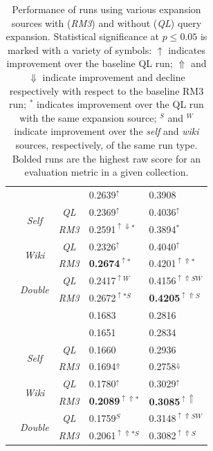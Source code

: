 \documentclass{sig-alternate}
\begin{document}
\begin{table}
\begin{tabular}{|c|c|c|l|l|}
\rule{0pt}{2.5ex} & \cellcolor{gray!50} \multirow{-2}{*}{\it Baseline} & \cellcolor{gray!50}{\it RM3} & \cellcolor{gray!50}0.2639$^\uparrow$ & \cellcolor{gray!50}0.3908 \\ \cline{2-5}
\rule{0pt}{2.5ex} & \multirow{2}{*}{\it Self} & {\it QL} & 0.2369$^\uparrow$ & 0.4036$^\uparrow$ \\ \cline{3-5}
\rule{0pt}{2.5ex} & & {\it RM3} & 0.2591$^{\uparrow\Downarrow *}$ & 0.3894$^{*}$ \\ \cline{2-5}
\rule{0pt}{2.5ex} & \multirow{2}{*}{\it Wiki} & {\it QL} & 0.2326$^\uparrow$ & 0.4040$^\uparrow$ \\ \cline{3-5}
\rule{0pt}{2.5ex} & & {\it RM3} & \textbf{0.2674}$^{\uparrow *}$ & 0.4201$^{\uparrow\Uparrow *}$ \\ \cline{2-5}
\rule{0pt}{2.5ex} & \multirow{2}{*}{\it Double} & {\it QL} & 0.2417$^{\uparrow W}$ & 0.4156$^{\uparrow\Uparrow SW}$ \\ \cline{3-5}
\rule{0pt}{2.5ex} & & {\it RM3} & 0.2672$^{\uparrow *S}$ & \textbf{0.4205}$^{\uparrow\Uparrow S}$ \\ \hline\hline
\rule{0pt}{2.5ex} \multirow{8}{*}{wt10g} & \cellcolor{gray!50} & \cellcolor{gray!50}{\it QL} & \cellcolor{gray!50}0.1683 & \cellcolor{gray!50}0.2816 \\ \cline{3-5}
\rule{0pt}{2.5ex} & \cellcolor{gray!50} \multirow{-2}{*}{\it Baseline} & \cellcolor{gray!50}{\it RM3} & \cellcolor{gray!50}0.1651 & \cellcolor{gray!50}0.2834 \\ \cline{2-5}
\rule{0pt}{2.5ex} & \multirow{2}{*}{\it Self} & {\it QL} & 0.1660 & 0.2936 \\ \cline{3-5}
\rule{0pt}{2.5ex} & & {\it RM3} & 0.1694$^\Uparrow$ & 0.2758$^\Downarrow$ \\ \cline{2-5}
\rule{0pt}{2.5ex} & \multirow{2}{*}{\it Wiki} & {\it QL} & 0.1780$^\uparrow$ & 0.3029$^\uparrow$ \\ \cline{3-5}
\rule{0pt}{2.5ex} & & {\it RM3} & \textbf{0.2089}$^{\uparrow\Uparrow *}$ & \textbf{0.3085}$^{\uparrow\Uparrow}$ \\ \cline{2-5}
\rule{0pt}{2.5ex} & \multirow{2}{*}{\it Double} & {\it QL} & 0.1759$^{S}$ & 0.3148$^{\uparrow\Uparrow SW}$ \\ \cline{3-5}
\rule{0pt}{2.5ex} & & {\it RM3} & 0.2061$^{\uparrow\Uparrow *S}$ & 0.3082$^{\uparrow\Uparrow S}$ \\ \hline
\end{tabular}
\caption{Performance of runs using various expansion sources with (\textit{RM3}) and without (\textit{QL}) query expansion. Statistical significance at $p \leq 0.05$ is marked with a variety of symbols: $\uparrow$ indicates improvement over the baseline QL run; $\Uparrow$ and $\Downarrow$ indicate improvement and decline respectively with respect to the baseline RM3 run; $^{*}$ indicates improvement over the QL run with the same expansion source; $^{S}$ and $^{W}$ indicate improvement over the \textit{self} and \textit{wiki} sources, respectively, of the same run type. Bolded runs are the highest raw score for an evaluation metric in a given collection.}
\label{table.performance}
\end{table}
\end{document}

